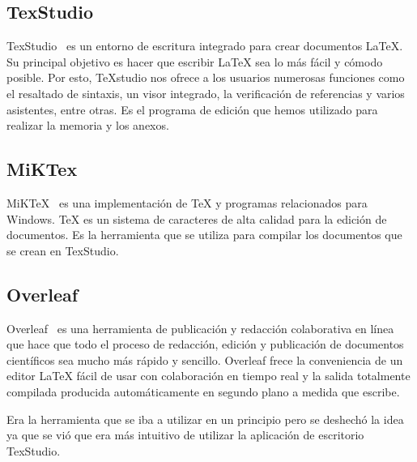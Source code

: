 \subsection{TexStudio}
TexStudio~\cite{TexStudio} es un entorno de escritura integrado para crear documentos LaTeX. Su principal objetivo es hacer que escribir \LaTeX{} sea lo más fácil y cómodo posible. Por esto, TeXstudio nos ofrece a los usuarios numerosas funciones como el resaltado de sintaxis, un visor integrado, la verificación de referencias y varios asistentes, entre otras. 
Es el programa de edición que hemos utilizado para realizar la memoria y los anexos.

\subsection{MiKTex}
MiKTeX~\cite{TexStudio} es una implementación de TeX y programas relacionados para Windows. TeX es un sistema de caracteres de alta calidad para la edición de documentos.
Es la herramienta que se utiliza para compilar los documentos que se crean en TexStudio.

\subsection{Overleaf}
Overleaf~\cite{Overleaf}  es una herramienta de publicación y redacción colaborativa en línea que hace que todo el proceso de redacción, edición y publicación de documentos científicos sea mucho más rápido y sencillo. Overleaf frece la conveniencia de un editor LaTeX fácil de usar con colaboración en tiempo real y la salida totalmente compilada producida automáticamente en segundo plano a medida que escribe.

Era la herramienta que se iba a utilizar en un principio pero se deshechó la idea ya que se vió que era más intuitivo de utilizar la aplicación de escritorio TexStudio.

